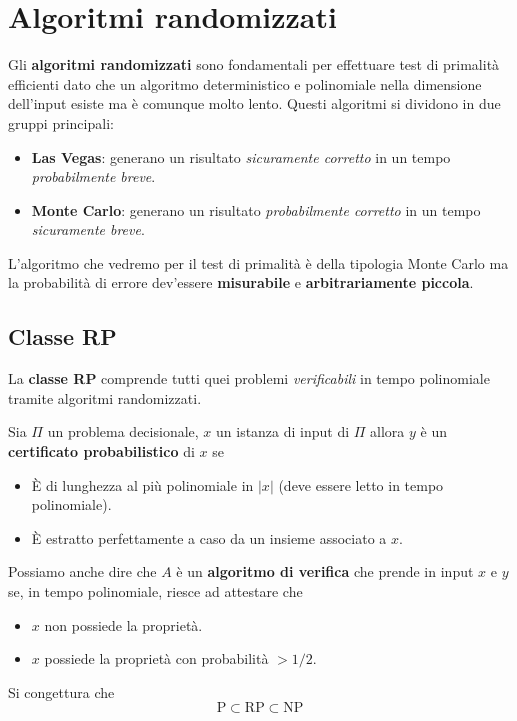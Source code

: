 \section{Algoritmi randomizzati}\label{algoritmi_random}
Gli \textbf{algoritmi randomizzati} sono fondamentali per effettuare test di primalit\`a efficienti dato che un
algoritmo deterministico e polinomiale nella dimensione dell'input esiste ma \`e comunque molto lento. Questi algoritmi
si dividono in due gruppi principali:
\begin{itemize}
	\item \textbf{Las Vegas}: generano un risultato \emph{sicuramente corretto} in un tempo \emph{probabilmente breve}.
	\item \textbf{Monte Carlo}: generano un risultato \emph{probabilmente corretto} in un tempo \emph{sicuramente breve}.
\end{itemize}
L'algoritmo che vedremo per il test di primalit\`a \`e della tipologia Monte Carlo ma la probabilit\`a di errore
dev'essere \textbf{misurabile} e \textbf{arbitrariamente piccola}.

\subsection{Classe RP}
La \textbf{classe RP} comprende tutti quei problemi \emph{verificabili} in tempo polinomiale tramite algoritmi
randomizzati.

Sia $\Pi$ un problema decisionale, $x$ un istanza di input di $\Pi$ allora $y$ \`e un \textbf{certificato probabilistico}
di $x$ se
\begin{itemize}
	\item \`E di lunghezza al pi\`u polinomiale in $|x|$ (deve essere letto in tempo polinomiale).
	\item \`E estratto perfettamente a caso da un insieme associato a $x$.
\end{itemize}
Possiamo anche dire che $A$ \`e un \textbf{algoritmo di verifica} che prende in input $x$ e $y$ se, in tempo polinomiale,
riesce ad attestare che
\begin{itemize}
	\item $x$ non possiede la propriet\`a.
	\item $x$ possiede la propriet\`a con probabilit\`a $> 1/2$.
\end{itemize}
Si congettura che
\[ \text{P} \subset \text{RP} \subset \text{NP} \]

